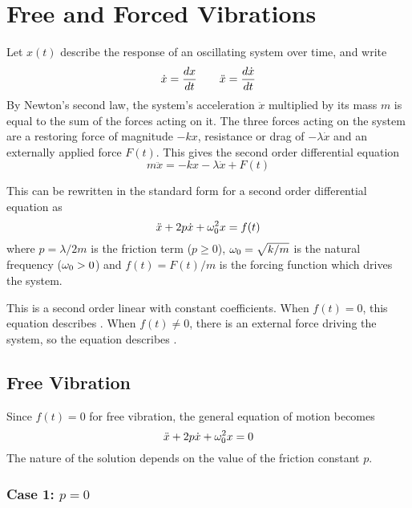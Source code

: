 \section{Free and Forced Vibrations}

Let $x(t)$ describe the response of an oscillating system over time, and write
$$\dot{x}=\frac{dx}{dt}\qquad\ddot{x}=\frac{d\dot{x}}{dt}$$
By Newton's second law, the system's acceleration $\ddot{x}$ multiplied by 
its mass $m$ is equal to the sum of the forces acting on it.   The three 
forces acting on the system are a restoring force of magnitude $-kx$,
resistance or drag of $-\lambda\dot{x}$ and an externally applied force 
$F(t)$.  This gives the second order differential equation
$$m\ddot{x}=-kx-\lambda\dot{x}+F(t)$$

This can be rewritten in the standard form for a second order differential 
equation as
$$\ddot{x}+2p\dot{x}+\omega_0^2x=f(t)$$
where $p=\lambda/2m$ is the friction term ($p\geq 0$), $\omega_0=\sqrt{k/m}$ is
the natural frequency ($\omega_0>0$) and $f(t)=F(t)/m$ is the forcing function
which drives the system.

This is a second order linear \ODE with constant coefficients.
When $f(t)=0$, this equation describes .  
When $f(t)\neq 0$, there is an external force driving the system, so the 
equation describes .

\subsection{Free Vibration}

Since $f(t)=0$ for free vibration, the general equation of motion becomes
$$\ddot{x}+2p\dot{x}+\omega_0^2x=0$$
The nature of the solution depends on the value of the friction constant
$p$.

\subsubsection{Case 1: $p=0$}

